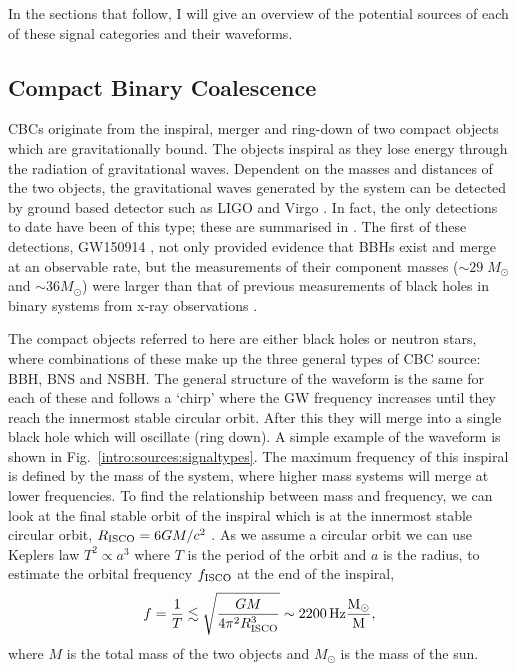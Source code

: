 In the sections that follow, I will give an overview of the potential sources
of each of these signal categories and their waveforms.


\subsection{\label{intro:sources:cbc}Compact Binary Coalescence}

\glspl{CBC} originate from the inspiral, merger and ring-down of two compact
objects which are gravitationally bound.  The objects inspiral as they lose
energy through the radiation of gravitational waves.  Dependent on the masses
and distances of the two objects, the gravitational waves generated by the
system can be detected by ground based detector such as \gls{LIGO}
\citep{aasi2015AdvancedLIGO} and Virgo \citep{acernese2015AdvancedVirgo}.  In
fact, the only detections to date have been of this type; these are summarised
in
\citep{ligoscientificcollaborationandvirgocollaboration2019GWTC1GravitationalWave}.
The first of these detections, GW150914
\citep{abbott2016ObservationGravitational}, not only provided evidence that
\glspl{BBH} exist and merge at an observable rate, but the measurements of
their component masses ($\sim 29\; M_{\odot}$ and $\sim 36 M_{\odot}$) were
larger than that of previous measurements of black holes in binary systems from
x-ray observations \citep{abbott2016ASTROPHYSICALIMPLICATIONS}. 

The compact objects referred to here are either black holes or neutron stars,
where combinations of these make up the three general types of \gls{CBC}
source: \gls{BBH}, \gls{BNS} and \gls{NSBH}.  The general structure of the
waveform is the same for each of these and follows a `chirp' where the \gls{GW}
frequency increases until they reach the innermost stable circular orbit.
After this they will merge into a single black hole which will oscillate (ring down). A simple example of the waveform is shown in
Fig.~\ref{intro:sources:signaltypes}.  The maximum frequency of this inspiral
is defined by the mass of the system, where higher mass systems will merge at
lower frequencies.  To find the relationship between mass and frequency, we can
look at the final stable orbit of the inspiral which is at the innermost stable
circular orbit, $R_{\rm{ISCO}} = 6GM/c^2$ \citep{maggioreGravitationalWaves}.
As we assume a circular orbit we can use Keplers law $T^2 \propto a^3$ where
$T$ is the period of the orbit and $a$ is the radius, to estimate the orbital
frequency $f_{\rm{ISCO}}$ at the end of the inspiral,
%
\begin{equation}
\label{intro:sources:cbc:freq}
    f = \frac{1}{T} \lesssim \sqrt{\frac{GM}{4 \pi^2 R_{\rm{ISCO}}^3}} \sim 2200 \, \rm{Hz} \frac{M_{\odot}}{M},
\end{equation}
where $M$ is the total mass of the two objects and $M_{\odot}$ is the mass of the sun.

